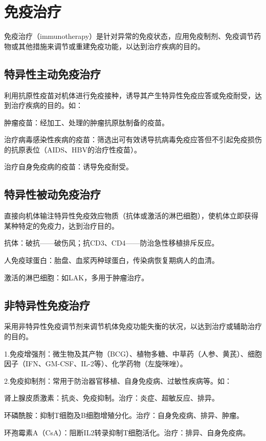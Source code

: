 \section{免疫治疗}

免疫治疗（immunotherapy）是针对异常的免疫状态，应用免疫制剂、免疫调节药物或其他措施来调节或重建免疫功能，以达到治疗疾病的目的。


\subsection{特异性主动免疫治疗}

利用抗原性疫苗对机体进行免疫接种，诱导其产生特异性免疫应答或免疫耐受，达到治疗疾病的目的。如：

肿瘤疫苗：经加工、处理的肿瘤抗原肽制备的疫苗。

治疗病毒感染性疾病的疫苗：筛选出可有效诱导抗病毒免疫应答但不引起免疫损伤的抗原表位（AIDS、HBV的治疗性疫苗）。

治疗自身免疫病的疫苗：诱导免疫耐受。


\subsection{特异性被动免疫治疗}

直接向机体输注特异性免疫效应物质（抗体或激活的淋巴细胞），使机体立即获得某种特定的免疫力，达到治疗目的。

抗体：破抗------破伤风；抗CD3、CD4------防治急性移植排斥反应。

人免疫球蛋白：胎盘、血浆丙种球蛋白，传染病恢复期病人的血清。

激活的淋巴细胞：如LAK，多用于肿瘤治疗。


\subsection{非特异性免疫治疗}

采用非特异性免疫调节剂来调节机体免疫功能失衡的状况，以达到治疗或辅助治疗的目的。

1.免疫增强剂：微生物及其产物（BCG）、植物多糖、中草药（人参、黄芪）、细胞因子（IFN、GM-CSF、IL-2等）、化学药物（左旋咪唑）。

2.免疫抑制剂：常用于防治器官移植、自身免疫病、过敏性疾病等。如：

肾上腺皮质激素：抗炎、免疫抑制。治疗：炎症、超敏反应、排异。

环磷酰胺：抑制T细胞及B细胞增殖分化。治疗：自身免疫病、排异、肿瘤。

环孢霉素A（CsA）：阻断IL2转录抑制T细胞活化。治疗：排异、自身免疫病。

